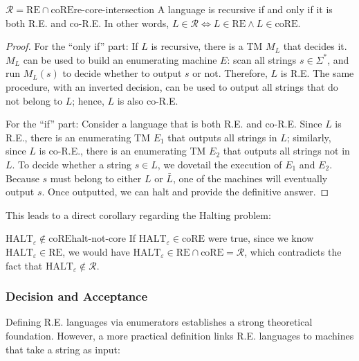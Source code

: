 \begin{theorem}{\(\mathcal{R} = \text{RE} \cap \text{coRE}\)}{re-core-intersection}
    A language is recursive if and only if it is both R.E. and co-R.E. In other words, \(L \in \mathcal{R} \iff L \in \text{RE} \land L \in \text{coRE}\).
    \begin{proof}
        For the ``only if'' part: If \(L\) is recursive, there is a TM \(M_L\) that decides it. \(M_L\) can be used to build an enumerating machine \(E\): scan all strings \(s \in \Sigma^*\), and run \(M_L(s)\) to decide whether to output \(s\) or not. Therefore, \(L\) is R.E. The same procedure, with an inverted decision, can be used to output all strings that do not belong to \(L\); hence, \(L\) is also co-R.E.
        
        For the ``if'' part: Consider a language that is both R.E. and co-R.E. Since \(L\) is R.E., there is an enumerating TM \(E_1\) that outputs all strings in \(L\); similarly, since \(L\) is co-R.E., there is an enumerating TM \(E_2\) that outputs all strings not in \(L\). To decide whether a string \(s \in L\), we dovetail the execution of \(E_1\) and \(E_2\). Because \(s\) must belong to either \(L\) or \(\bar{L}\), one of the machines will eventually output \(s\). Once outputted, we can halt and provide the definitive answer.
    \end{proof}
\end{theorem}

\noindent This leads to a direct corollary regarding the Halting problem:
\begin{corollary}{\(\text{HALT}_\varepsilon \notin \text{coRE}\)}{halt-not-core}
    If \(\text{HALT}_\varepsilon \in \text{coRE}\) were true, since we know \(\text{HALT}_\varepsilon \in \text{RE}\), we would have \(\text{HALT}_\varepsilon \in \text{RE} \cap \text{coRE} = \mathcal{R}\), which contradicts the fact that \(\text{HALT}_\varepsilon \notin \mathcal{R}\).
\end{corollary}

\subsubsection*{Decision and Acceptance}

Defining R.E. languages via enumerators establishes a strong theoretical foundation. However, a more practical definition links R.E. languages to machines that take a string as input:

